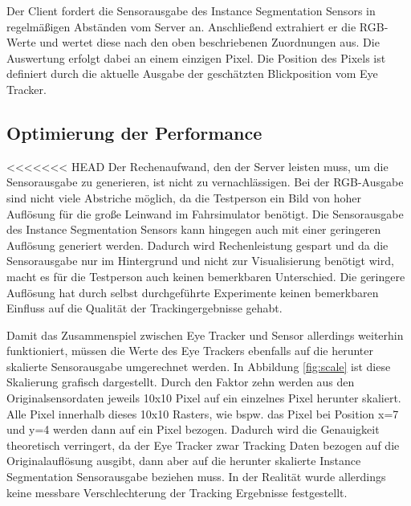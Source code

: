 Der Client fordert die Sensorausgabe des Instance Segmentation Sensors in regelmäßigen Abständen vom Server an. Anschließend extrahiert er die RGB-Werte und wertet diese nach den oben beschriebenen Zuordnungen aus. Die Auswertung erfolgt dabei an einem einzigen Pixel. Die Position des Pixels ist definiert durch die aktuelle Ausgabe der geschätzten Blickposition vom Eye Tracker. 

\subsection{Optimierung der Performance}
<<<<<<< HEAD
Der Rechenaufwand, den der Server leisten muss, um die Sensorausgabe zu generieren, ist nicht zu vernachlässigen. Bei der RGB-Ausgabe sind nicht viele Abstriche möglich, da die Testperson ein Bild von hoher Auflösung für die große Leinwand im Fahrsimulator benötigt. Die Sensorausgabe des Instance Segmentation Sensors kann hingegen auch mit einer geringeren Auflösung generiert werden. Dadurch wird Rechenleistung gespart und da die Sensorausgabe nur im Hintergrund und nicht zur Visualisierung benötigt wird, macht es für die Testperson auch keinen bemerkbaren Unterschied. Die geringere Auflösung hat durch selbst durchgeführte Experimente keinen bemerkbaren Einfluss auf die Qualität der Trackingergebnisse gehabt. 

Damit das Zusammenspiel zwischen Eye Tracker und Sensor allerdings weiterhin funktioniert, müssen die Werte des Eye Trackers ebenfalls auf die herunter skalierte Sensorausgabe umgerechnet werden. In Abbildung \ref{fig:scale} ist diese Skalierung grafisch dargestellt. Durch den Faktor zehn werden aus den Originalsensordaten jeweils 10x10 Pixel auf ein einzelnes Pixel herunter skaliert. Alle Pixel innerhalb dieses 10x10 Rasters, wie bspw. das Pixel bei Position x=7 und y=4 werden dann auf ein Pixel bezogen. Dadurch wird die Genauigkeit theoretisch verringert, da der Eye Tracker zwar Tracking Daten bezogen auf die Originalauflösung ausgibt, dann aber auf die herunter skalierte Instance Segmentation Sensorausgabe beziehen muss. In der Realität wurde allerdings keine messbare Verschlechterung der Tracking Ergebnisse festgestellt.


